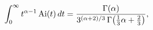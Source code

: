 \[\int_{0}^{\infty}t^{\alpha-1}\mathop{\mathrm{Ai}\/}\nolimits\!\left(t\right)dt%
=\frac{\mathop{\Gamma\/}\nolimits\!\left(\alpha\right)}{3^{(\alpha+2)/3}%
\mathop{\Gamma\/}\nolimits\!\left(\tfrac{1}{3}\alpha+\tfrac{2}{3}\right)},\]